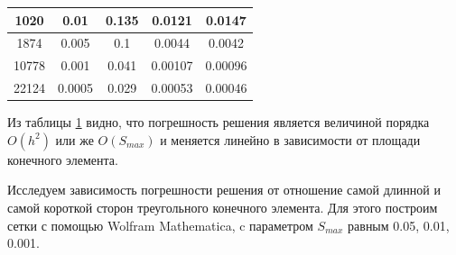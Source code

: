 \documentclass[12pt, a4paper]{article}
\begin{document}
\begin{table}[!h]
\begin{tabular}{|c|c|c|c|c|}
					
					\hline
					1020
					& 0.01
					& 0.135
					& 0.0121
					& 0.0147 \\ 
					
						
					\hline
					1874
					& 0.005
					& 0.1
					& 0.0044
					& 0.0042 \\
					
					\hline
					10778
					& 0.001
					& 0.041
					& 0.00107
					& 0.00096 \\ 
					
					\hline
					22124
					& 0.0005
					& 0.029
					& 0.00053 
					& 0.00046 \\ 
					
					\hline
				\end{tabular}
				\label{table: 4}				
			\end{table}		
			\vspace*{-5mm}
			
			Из таблицы \ref{table: 4} видно, что погрешность решения является величиной порядка $O(h^2)$ или же $O(S_{max})$ и меняется линейно в зависимости от площади конечного элемента.
		 
			Исследуем зависимость погрешности решения от отношение самой длинной и самой короткой сторон треугольного конечного элемента. Для этого построим сетки с помощью Wolfram Mathematica, c параметром $S_{max}$ равным 0.05, 0.01, 0.001.
			
\end{document}

